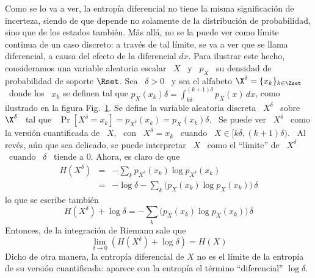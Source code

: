 Como se lo va a ver, la entrop\'ia diferencial no tiene la misma significaci\'on
de  incerteza,  siendo de  que  depende no  solamente  de  la distribuci\'on  de
probabilidad, sino que  de los estados tambi\'en.  M\'as all\'a,  no se la puede
ver como l\'imite  continua de un caso discreto: a trav\'es  de tal l\'imite, se
va a ver  que se llama diferencial,  a causa del efecto de  la diferencial $dx$.
Para ilustrar este hecho, consideramos una  variable aleatoria escalar \ $X$ \ y
\ $p_X$ \ su densidad de probabilidad  de soporte $\Rset$.  Sea \ $\delta > 0$ \
y sea el alfabeto  $\X^\delta = \{ x_k \}_{k \in \Zset}$ \  donde los \ $x_k$ se
definen tal que $\displaystyle  p_X(x_k) \delta = \int_{k \delta}^{(k+1) \delta}
p_X(x) \,  dx$, como  ilustrado en la  figura Fig.~\ref{fig:SZ:CuantificacionX}.
Se define  la variable aleatoria discreta  \ $X^\delta$ \ sobre  \ $\X^\delta$ \
tal que  \ $\Pr[X^\delta =  x_k] = p_{X^\delta}(x_k)  = p_X(x_k) \delta$.   \ Se
puede  ver \  $X^\delta$ \  como la  versi\'on cuantificada  de \  $X$, \  con \
$X^\delta = x_k$ \  cuando \ $X \in [k \delta , (k+1)  \delta )$.  \ Al rev\'es,
a\'un que sea delicado,  se puede interpretar \ $X$ \ como  el ``l\'imite'' de \
$X^\delta$ \ cuando \ $\delta$ \ tiende a 0. Ahora, es claro de que
%
\begin{eqnarray*}
H(X^\delta) & = & - \sum_k p_{X^\delta}(x_k) \log p_{X^\delta}(x_k)\\[2.5mm]
%
& = & - \log \delta - \sum_k \Big( p_X(x_k) \log p_X(x_k) \Big) \, \delta
\end{eqnarray*}
%
lo que se escribe tambi\'en
%
\[
H(X^\delta)  + \log  \delta =  - \sum_k  \Big( p_X(x_k)  \log p_X(x_k)  \Big) \,
\delta
\]
%
Entonces, de la integraci\'on de Riemann sale que
%
\[
\lim_{\delta \to 0} \left( H(X^\delta) + \log \delta \right) = H(X)
\]
%
Dicho de otra manera,  la entrop\'ia diferencial de $X$ no es  el l\'imite de la
entrop\'ia de su versi\'on cuantificada:  aparece con la entrop\'ia el t\'ermino
``diferencial'' $\log \delta$.
%
\begin{figure}[h!]
%
\begin{center}  \end{center}
%
%
\label{fig:SZ:CuantificacionX}
\end{figure}
%

